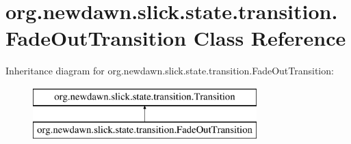 \hypertarget{classorg_1_1newdawn_1_1slick_1_1state_1_1transition_1_1_fade_out_transition}{}\section{org.\+newdawn.\+slick.\+state.\+transition.\+Fade\+Out\+Transition Class Reference}
\label{classorg_1_1newdawn_1_1slick_1_1state_1_1transition_1_1_fade_out_transition}
Inheritance diagram for org.\+newdawn.\+slick.\+state.\+transition.\+Fade\+Out\+Transition\+:\begin{figure}[H]
\begin{center}
\leavevmode
\includegraphics[height=2.000000cm]{classorg_1_1newdawn_1_1slick_1_1state_1_1transition_1_1_fade_out_transition}
\end{center}
\end{figure}
